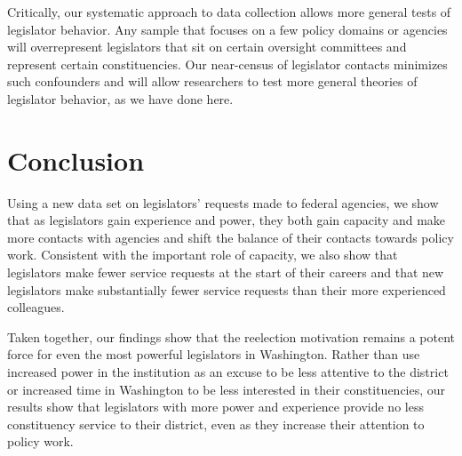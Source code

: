 \documentclass[12pt]{article}
\begin{document}
{Critically, our systematic approach to data collection allows more general tests of legislator behavior. Any sample that focuses on a few policy domains or agencies will overrepresent legislators that sit on certain oversight committees and represent certain constituencies. Our near-census of legislator contacts minimizes such confounders and will allow researchers to test more general theories of legislator behavior, as we have done here.


\section{Conclusion} \label{s:conclude}

Using a new data set on legislators' requests made to federal agencies, we show that as legislators gain experience and power, they both gain capacity and make more contacts with agencies and shift the balance of their contacts towards policy work. Consistent with the important role of capacity, we also show that legislators make fewer service requests at the start of their careers and that new legislators make substantially fewer service requests than their more experienced colleagues. 


Taken together, our findings show that the reelection motivation remains a potent force for even the most powerful legislators in Washington. Rather than use increased power in the institution as an excuse to be less attentive to the district or increased time in Washington to be less interested in their constituencies, our results show that legislators with more power and experience provide no less constituency service to their district, even as they increase their attention to policy work. 

}
\end{document}
